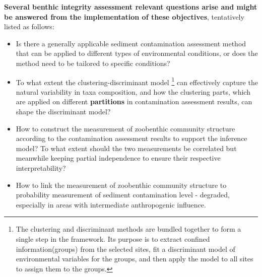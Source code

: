 \textbf{Several benthic integrity assessment relevant questions arise and might be answered from the implementation of these objectives},
tentatively listed as follows:
\begin{itemize}
    \item Is there a generally applicable sediment contamination assessment method that can be applied to different types of 
    environmental conditions, or does the method need to be tailored to specific conditions?

    \item To what extent the clustering-discriminant model
    \footnote{The clustering and discriminant methods are bundled together to form a single step in the framework. 
    Its purpose is to extract confined information(groups) from the selected sites, 
    fit a discriminant model of environmental variables
    for the groups, and then apply the model to all sites to assign them to the groups.}
    can effectively capture the natural variability in taxa composition,
    and how the clustering parts, which are applied on different \textbf{partitions} in contamination assessment results,
    can shape the discriminant model?

    \item How to construct the measurement of zoobenthic community structure according to the contamination assessment results 
    to support the inference model? To what extent should the two measurements be correlated but meanwhile keeping partial independence 
    to ensure their respective interpretability?

    \item How to link the measurement of zoobenthic community structure to probability measurement of sediment contamination level
     - degraded, especially in areas with intermediate anthropogenic influence.
\end{itemize}





